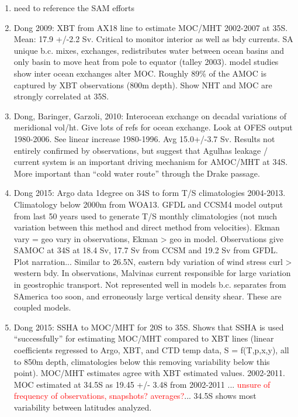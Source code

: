 \documentclass[a4paper,11pt]{article}
\newcommand{\red}[1]{\textcolor{red}{#1}}
\begin{document}
	\begin{enumerate}
	\item need to reference the SAM efforts
	\item Dong 2009: XBT from AX18 line to estimate MOC/MHT 2002-2007 at 35S. Mean: 17.9 +/-2.2 Sv. Critical to monitor interior as well as bdy currents. SA unique b.c. mixes, exchanges, redistributes water between ocean basins and only basin to move heat from pole to equator (talley 2003). model studies show inter ocean exchanges alter MOC. Roughly 89\% of the AMOC is captured by XBT observations (800m depth). Show NHT and MOC are strongly correlated at 35S. 
	\item Dong, Baringer, Garzoli, 2010: Interocean exchange on decadal variations of meridional vol/ht. Give lots of refs for ocean exchange. Look at OFES output 1980-2006. See linear increase 1980-1996. Avg 15.0+/-3.7 Sv. Results not entirely confirmed by observations, but suggest that Agulhas leakage / current system is an important driving mechanism for AMOC/MHT at 34S. More important than ``cold water route'' through the Drake passage. 
	\item Dong 2015: Argo data 1degree on 34S to form T/S climatologies 2004-2013. Climatology below 2000m from WOA13. GFDL and CCSM4 model output from last 50 years used to generate T/S monthly climatologies (not much variation between this method and direct method from velocities). Ekman vary = geo vary in observations, Ekman > geo in model. Observations give SAMOC at 34S at 18.4 Sv, 17.7 Sv from CCSM and 19.2 Sv from GFDL. Plot narration... Similar to 26.5N, eastern bdy variation of wind stress curl > western bdy. In observations, Malvinas current responsible for large variation in geostrophic transport. Not represented well in models b.c. separates from SAmerica too soon, and erroneously large vertical density shear. These are coupled models. 
	\item Dong 2015: SSHA to MOC/MHT for 20S to 35S. Shows that SSHA is used ``successfully'' for estimating MOC/MHT compared to XBT lines (linear coefficients regressed to Argo, XBT, and CTD temp data, S = f(T,p,x,y), all to 850m depth, climatologies below this removing variability below this point). MOC/MHT estimates agree with XBT estimated values. 2002-2011. MOC estimated at 34.5S as 19.45 +/- 3.48 from 2002-2011 ... \red{unsure of frequency of observations, snapshots? averages?}... 34.5S shows most variability between latitudes analyzed. 
	\end{enumerate}
\end{document}
